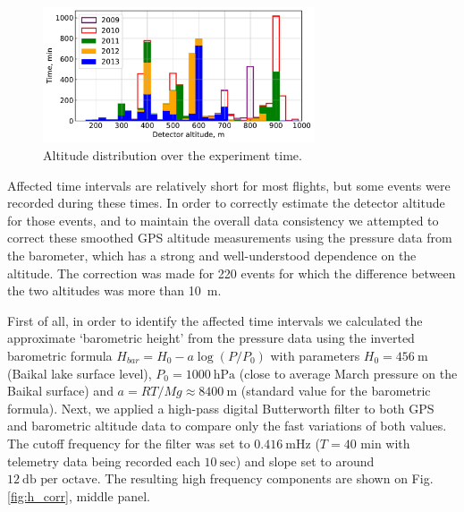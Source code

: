 \documentclass[final,5p,times,twocolumn]{elsarticle}
\begin{document}
\begin{figure}[t]
    \includegraphics[width=19pc]{figs/time_on_altitude_c.pdf}%
    \caption{Altitude distribution over the experiment time.}
    \label{fig:time_on_altitude}
\end{figure}

Affected time intervals are relatively short for most flights, but some events were recorded during these times. In order to correctly estimate the detector altitude for those events, and to maintain the overall data consistency we attempted to correct these smoothed GPS altitude measurements using the pressure data from the barometer, which has a strong and well-understood dependence on the altitude. The correction was made for 220 events for which the difference between the two altitudes was more than 10~m.

First of all, in order to identify the affected time intervals we calculated the approximate `barometric height' from the pressure data using the inverted barometric formula $H_{bar} = H_0 - a \log (P/P_0)$ with parameters $H_0 = 456~\textrm{m}$ (Baikal lake surface level), $P_0 = 1000~\textrm{hPa}$ (close to average March pressure on the Baikal surface) and $a = {RT}/{Mg} \approx 8400~\textrm{m}$ (standard value for the barometric formula). Next, we applied a high-pass digital Butterworth filter to both GPS and barometric altitude data to compare only the fast variations of both values. The cutoff frequency for the filter was set to $0.416~\textrm{mHz}$ ($T=40$ min with telemetry data being recorded each $10~\textrm{sec}$) and slope set to around $12~\textrm{db per octave}$. The resulting high frequency components are shown on Fig. \ref{fig:h_corr}, middle panel.
\end{document}
